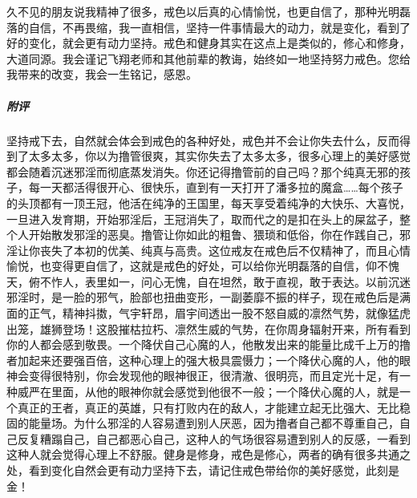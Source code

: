 \begin{case}
    久不见的朋友说我精神了很多，戒色以后真的心情愉悦，也更自信了，那种光明磊落的自信，不再畏缩，我一直相信，坚持一件事情最大的动力，就是变化，看到了好的变化，就会更有动力坚持。戒色和健身其实在这点上是类似的，修心和修身，大道同源。我会谨记飞翔老师和其他前辈的教诲，始终如一地坚持努力戒色。您给我带来的改变，我会一生铭记，感恩。
    \subparagraph{附评} 坚持戒下去，自然就会体会到戒色的各种好处，戒色并不会让你失去什么，反而得到了太多太多，你以为撸管很爽，其实你失去了太多太多，很多心理上的美好感觉都会随着沉迷邪淫而彻底蒸发消失。你还记得撸管前的自己吗？那个纯真无邪的孩子，每一天都活得很开心、很快乐，直到有一天打开了潘多拉的魔盒……每个孩子的头顶都有一顶王冠，他活在纯净的王国里，每天享受着纯净的大快乐、大喜悦，一旦进入发育期，开始邪淫后，王冠消失了，取而代之的是扣在头上的屎盆子，整个人开始散发邪淫的恶臭。撸管让你如此的粗鲁、猥琐和低俗，你在作践自己，邪淫让你丧失了本初的优美、纯真与高贵。这位戒友在戒色后不仅精神了，而且心情愉悦，也变得更自信了，这就是戒色的好处，可以给你光明磊落的自信，仰不愧天，俯不怍人，表里如一，问心无愧，自在坦然，敢于直视，敢于表达。以前沉迷邪淫时，是一脸的邪气，脸部也扭曲变形，一副萎靡不振的样子，现在戒色后是满面的正气，精神抖擞，气宇轩昂，眉宇间透出一股不怒自威的凛然气势，就像猛虎出笼，雄狮登场！这股摧枯拉朽、凛然生威的气势，在你周身辐射开来，所有看到你的人都会感到敬畏。一个降伏自己心魔的人，他散发出来的能量比成千上万的撸者加起来还要强百倍，这种心理上的强大极具震慑力；一个降伏心魔的人，他的眼神会变得很特别，你会发现他的眼神很正，很清澈、很明亮，而且定光十足，有一种威严在里面，从他的眼神你就会感觉到他很不一般；一个降伏心魔的人，就是一个真正的王者，真正的英雄，只有打败内在的敌人，才能建立起无比强大、无比稳固的能量场。为什么邪淫的人容易遭到别人厌恶，因为撸者自己都不尊重自己，自己反复糟蹋自己，自己都恶心自己，这种人的气场很容易遭到别人的反感，一看到这种人就会觉得心理上不舒服。健身是修身，戒色是修心，两者的确有很多共通之处，看到变化自然会更有动力坚持下去，请记住戒色带给你的美好感觉，此刻是金！
\end{case}

